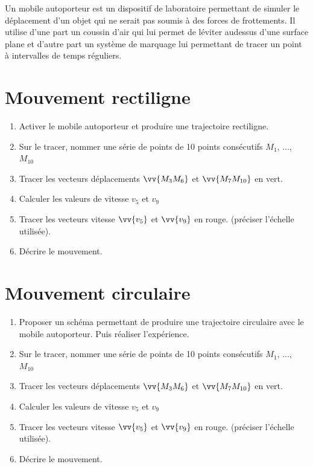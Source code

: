 \documentclass[a4paper,14pt,fleqn]{scrartcl}%
\begin{document}
\maketitle
Un mobile autoporteur est un dispositif de laboratoire permettant de simuler le déplacement d'un objet qui ne serait pas soumis à des forces de frottements. Il utilise d'une part un coussin d'air qui lui permet de léviter audessus d'une surface plane et d'autre part un système de marquage lui permettant de tracer un point à intervalles de temps réguliers.
\section{Mouvement rectiligne}
\begin{enumerate}
    \item Activer le mobile autoporteur et produire une trajectoire rectiligne.
    \item Sur le tracer, nommer une série de points de 10 points consécutifs $M_1$, ..., $M_{10}$
    \item Tracer les vecteurs déplacements $\vv{M_3M_6}$ et $\vv{M_7M_{10}}$ en vert.
    \item Calculer les valeurs de vitesse $v_5$ et $v_9$
    \item Tracer les vecteurs vitesse $\vv{v_5}$ et $\vv{v_9}$ en rouge. (préciser l'échelle utilisée).
    \item Décrire le mouvement.
\end{enumerate}

\section{Mouvement circulaire}
\begin{enumerate}
    \item Proposer un schéma permettant de produire une trajectoire circulaire avec le mobile autoporteur. Puis réaliser l'expérience.
    \item Sur le tracer, nommer une série de points de 10 points consécutifs $M_1$, ..., $M_{10}$
    \item Tracer les vecteurs déplacements $\vv{M_3M_6}$ et $\vv{M_7M_{10}}$ en vert.
    \item Calculer les valeurs de vitesse $v_5$ et $v_9$
    \item Tracer les vecteurs vitesse $\vv{v_5}$ et $\vv{v_9}$ en rouge. (préciser l'échelle utilisée).
    \item Décrire le mouvement.
\end{enumerate}
\end{document}
